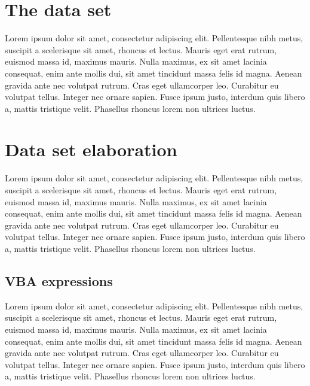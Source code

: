 \section{The data set}\label{sec:dataset}
Lorem ipsum dolor sit amet, consectetur adipiscing elit. Pellentesque nibh metus, suscipit a scelerisque sit amet, rhoncus et lectus. Mauris eget erat rutrum, euismod massa id, maximus mauris. Nulla maximus, ex sit amet lacinia consequat, enim ante mollis dui, sit amet tincidunt massa felis id magna. Aenean gravida ante nec volutpat rutrum. Cras eget ullamcorper leo. Curabitur eu volutpat tellus. Integer nec ornare sapien. Fusce ipsum justo, interdum quis libero a, mattis tristique velit. Phasellus rhoncus lorem non ultrices luctus.


\section{Data set elaboration}\label{sec:datasetelaboration}
Lorem ipsum dolor sit amet, consectetur adipiscing elit. Pellentesque nibh metus, suscipit a scelerisque sit amet, rhoncus et lectus. Mauris eget erat rutrum, euismod massa id, maximus mauris. Nulla maximus, ex sit amet lacinia consequat, enim ante mollis dui, sit amet tincidunt massa felis id magna. Aenean gravida ante nec volutpat rutrum. Cras eget ullamcorper leo. Curabitur eu volutpat tellus. Integer nec ornare sapien. Fusce ipsum justo, interdum quis libero a, mattis tristique velit. Phasellus rhoncus lorem non ultrices luctus.


\subsection{VBA expressions}\label{sub:vbaexpressions}
Lorem ipsum dolor sit amet, consectetur adipiscing elit. Pellentesque nibh metus, suscipit a scelerisque sit amet, rhoncus et lectus. Mauris eget erat rutrum, euismod massa id, maximus mauris. Nulla maximus, ex sit amet lacinia consequat, enim ante mollis dui, sit amet tincidunt massa felis id magna. Aenean gravida ante nec volutpat rutrum. Cras eget ullamcorper leo. Curabitur eu volutpat tellus. Integer nec ornare sapien. Fusce ipsum justo, interdum quis libero a, mattis tristique velit. Phasellus rhoncus lorem non ultrices luctus.

